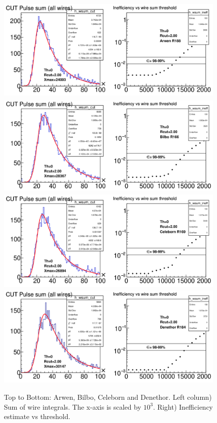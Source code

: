\documentclass[12pt]{article}
\begin{document}
\begin{figure}[tbph]
\begin{center}
\includegraphics[height=5cm,clip=true]{Arwen_R188_eff}
\includegraphics[height=5cm,clip=true]{Bilbo_R166_eff}
\includegraphics[height=5cm,clip=true]{Celeborn_R169_eff}
\includegraphics[height=5cm,clip=true]{Denethor_R184_eff}
\caption{Top to Bottom: Arwen, Bilbo, Celeborn and Denethor. Left column) Sum of wire integrals. The x-axis is scaled by $10^3$. Right) Inefficiency estimate vs threshold.
\label{fig:efficiencies_a-d}}
\end{center}
\end{figure} 
\end{document}
